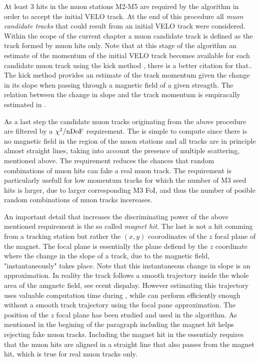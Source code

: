 At least 3 hits in the muon stations M2-M5 are required by the \mvm algorithm in order to accept the initial VELO track.
At the end of this procedure all {\it muon candidate tracks} that could result from an initial VELO track were considered.
Within the scope of the current chapter a muon candidate track is defined as the track formed by muon hits only.
Note that at this stage of the algorithm an estimate of the momentum of the initial VELO track becomes available
for each candidate muon track using the kick method \cite{roelThesis}, {\color{red} there is a better citation for that.}.
The kick method provides an estimate of the track momentum given the change in its slope when passing through a magnetic
field of a given streagth. The relation between the change in slope and the track momentum is empiracally estimated
in \cite{roelThesis}.

As a last step the candidate muon tracks originating from the above procedure are filtered by a $\chi^2/{\rm nDoF}$
requirement. The \chisq is simple to compute since there is no magnetic field in the region of the muon stations
and all tracks are in principle almost straight lines, taking into account the presence of multiple scattering, mentioned above.
The \chisq requirement reduces the chances that random combinations of muon hits can fake a real muon track.
The requirement is particularly usefull for low momentum tracks for which the number of M3 seed hits is larger,
due to larger corresponding M3 FoI, and thus the number of posible random combinations of muon tracks incereases.

An important detail that increases the discriminating power of the above mentioned \chisq requirement is the
so called {\it magnet hit}. The last is not a hit comming from a tracking station but rather the $(x,y)$ coorodinates
of the $z$ focal plane of the \lhcb magnet. The focal plane is essentially the plane defiend by the $z$ coordinate
where the change in the slope of a track, due to the magnetic field,  "instantaneously" takes place. Note that this
instantaneous change in slope is an approximation. In reality the track follows a smooth trajectory inside the whole
area of the amgnetc field, see {\color{red} ecent dispalay}. However estimating this trajectory uses valuable computation time during \hltone, while
\mvm can perform efficiently enough without a smooth track trajectory using the focal pane approximation.
The position of the $z$ focal plane has been studied \cite{} and used in the \mvm algorithm.
As mentioned in the begining of the paragraph including the magnet hit helps rejecting fake muon tracks.
Including the magnet hit in the \chisq essentialy requires that the muon hits are aligned in a straight line that
also passes from the magnet hit, which is true for real muon tracks only.

